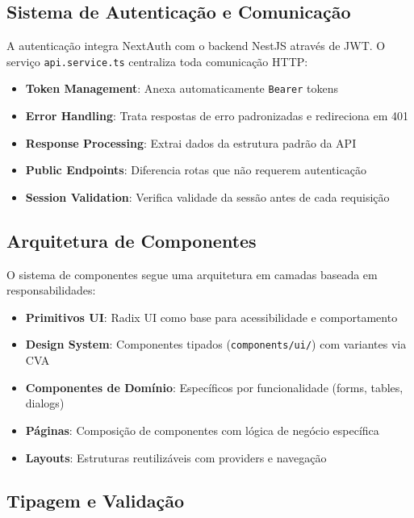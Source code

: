 \subsection{Sistema de Autenticação e Comunicação}

A autenticação integra NextAuth com o backend NestJS através de JWT. O serviço \texttt{api.service.ts} centraliza toda comunicação HTTP:

\begin{itemize}
  \item \textbf{Token Management}: Anexa automaticamente \texttt{Bearer} tokens
  \item \textbf{Error Handling}: Trata respostas de erro padronizadas e redireciona em 401
  \item \textbf{Response Processing}: Extrai dados da estrutura padrão da API
  \item \textbf{Public Endpoints}: Diferencia rotas que não requerem autenticação
  \item \textbf{Session Validation}: Verifica validade da sessão antes de cada requisição
\end{itemize}

\subsection{Arquitetura de Componentes}

O sistema de componentes segue uma arquitetura em camadas baseada em responsabilidades:

\begin{itemize}
  \item \textbf{Primitivos UI}: Radix UI como base para acessibilidade e comportamento
  \item \textbf{Design System}: Componentes tipados (\texttt{components/ui/}) com variantes via CVA
  \item \textbf{Componentes de Domínio}: Específicos por funcionalidade (forms, tables, dialogs)
  \item \textbf{Páginas}: Composição de componentes com lógica de negócio específica
  \item \textbf{Layouts}: Estruturas reutilizáveis com providers e navegação
\end{itemize}

\subsection{Tipagem e Validação}

